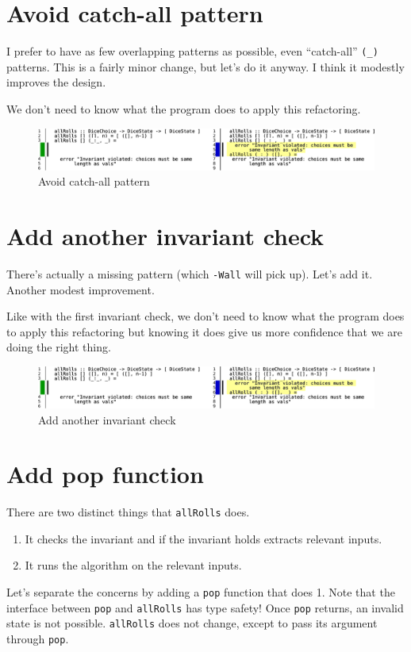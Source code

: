 \section{Avoid catch-all pattern}

I prefer to have as few overlapping patterns as possible, even ``catch-all'' \texttt{(\_)} patterns. This is a fairly minor change, but let's do it anyway. I think it modestly improves the design.

We don't need to know what the program does to apply this refactoring.

\begin{figure}[htbp]
 \centering
 \includegraphics[width=\linewidth]{./pics/diff2.pdf}
 \caption{Avoid catch-all pattern}
 \label{fig:diff2}
\end{figure}

\section{Add another invariant check}

There's actually a missing pattern (which \texttt{-Wall} will pick up). Let's add it. Another modest improvement.

Like with the first invariant check, we don't need to know what the program does to apply this refactoring but knowing it does give us more confidence that we are doing the right thing.

\begin{figure}[htbp]
 \centering
 \includegraphics[width=\linewidth]{./pics/diff3.pdf}
 \caption{Add another invariant check}
 \label{fig:diff3}
\end{figure}

\section{Add pop function}

There are two distinct things that \texttt{allRolls} does.

\begin{enumerate}
\item It checks the invariant and if the invariant holds extracts relevant inputs.
\item It runs the algorithm on the relevant inputs.
\end{enumerate}
Let's separate the concerns by adding a \texttt{pop} function that does 1. Note that the interface between \texttt{pop} and \texttt{allRolls} has type safety! Once \texttt{pop} returns, an invalid state is not possible. \texttt{allRolls} does not change, except to pass its argument through \texttt{pop}.

